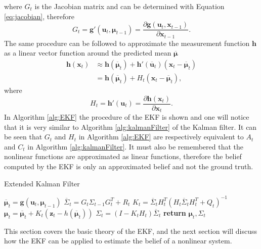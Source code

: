 \documentclass[12pt,oneside,openany,a4paper, %
afrikaans,english,
]{memoir}
\numberwithin{equation}{chapter}
\begin{document}
{where $G_t$ is the Jacobian matrix and can be determined with Equation \ref{eq:jacobian}, therefore
\begin{equation}\label{eq:Gt}
G_t = \bm{g}'(\bm{u}_t, \bm{\mu}_{t-1}) = \frac{\partial \bm{g}(\bm{u}_t, \bm{x}_{t-1})}{\partial \bm{x}_{t-1}}.
\end{equation}
The same procedure can be followed to approximate the measurement function $\bm{h}$ as a linear vector function around the predicted mean $\overline{\bm{\mu}}$
\begin{equation}
\begin{split}
\bm{h}(\bm{x}_{t}) & \approx \bm{h}(\bm{\overline{\mu}}_{t}) + \bm{h}'(\bm{\overline{u}}_t)(\bm{x}_{t} - \bm{\overline{\mu}}_{t})\\
& = \bm{h}(\bm{\overline{\mu}}_t) + H_t(\bm{x}_{t} - 
\bm{\overline{\mu}}_{t}),
\end{split}  
\end{equation}
where
\begin{equation}\label{eq:Ht}
H_t = \bm{h}'(\bm{u}_t) = \frac{\partial \bm{h}(\bm{x}_{t})}{\partial \bm{x}_{t}}.
\end{equation}
In Algorithm \ref{alg:EKF} the procedure of the EKF is shown and one will notice that it is very similar to Algorithm \ref{alg:kalmanFilter} of the Kalman filter. It can be seen that $G_t$ and $H_t$ in Algorithm \ref{alg:EKF} are respectively equivalent to $A_t$ and $C_t$ in Algorithm \ref{alg:kalmanFilter}. It must also be remembered that the nonlinear functions are approximated as linear functions, therefore the belief computed by the EKF is only an approximated belief and not the ground truth.

\begin{algorithm}
\caption{Extended Kalman Filter}\label{alg:EKF}
\begin{algorithmic}[1]
\State $\overline{\bm{\mu}}_t = \bm{g}(\bm{u}_t, \bm{\mu}_{t-1})$
\State $\overline{\Sigma}_t = G_t \Sigma_{t-1} G_t^T + R_t$
\State $K_t = \overline{\Sigma}_t H_t^T(H_t\overline{\Sigma}_t H_t^T + Q_t)^{-1}$
\State $\bm{\mu}_t = \overline{\bm{\mu}}_t + K_t(\bm{z}_t - h(\overline{\bm{\mu}}_t))$
\State $\Sigma_t = (I - K_tH_t)\overline{\Sigma}_t$
\State \textbf{return} $\bm{\mu}_t, \Sigma_t$
\EndProcedure
\end{algorithmic}
\end{algorithm}
This section covers the basic theory of the EKF, and the next section will discuss how the EKF can be applied to estimate the belief of a nonlinear system.
}
\end{document}
